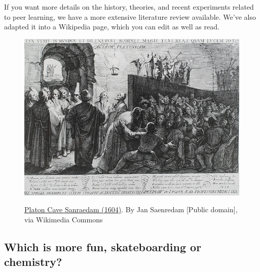 If you want more details on the history, theories, and recent
experiments related to peer learning, we have a more extensive
literature review available. We've also adapted it into a Wikipedia
page, which you can edit as well as read.

\begin{figure}
\begin{center}
\href{http://commons.wikimedia.org/wiki/File:Platon\_Cave\_Sanraedam\_1604.jpg}{\includegraphics[width=.8\textwidth]{../pictures/plato_cave.jpg}}
\end{center}
\caption*{\href{http://commons.wikimedia.org/w/index.php?title=File:Platon\_Cave\_Sanraedam\_1604.jpg\&oldid=68567627}{Platon Cave Sanraedam (1604)}. By Jan Saenredam {[}Public domain{]}, via
Wikimedia Commons}
\end{figure}

\subsection{Which is more fun, skateboarding or chemistry?}

